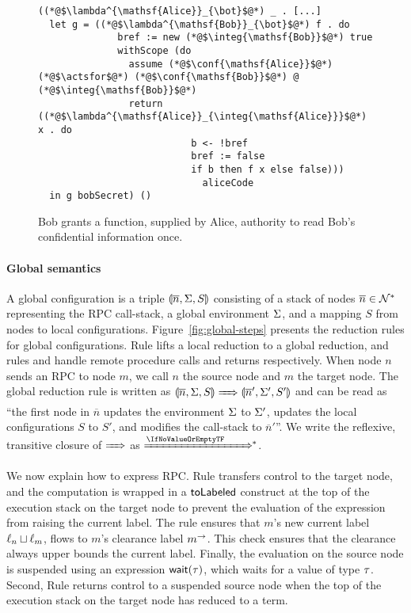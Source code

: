 \begin{figure}
\centering
\begin{lstlisting}
((*@$\lambda^{\mathsf{Alice}}_{\bot}$@*) _ . [...]
  let g = ((*@$\lambda^{\mathsf{Bob}}_{\bot}$@*) f . do
              bref := new (*@$\integ{\mathsf{Bob}}$@*) true
              withScope (do
                assume (*@$\conf{\mathsf{Alice}}$@*) (*@$\actsfor$@*) (*@$\conf{\mathsf{Bob}}$@*) @ (*@$\integ{\mathsf{Bob}}$@*)
                return ((*@$\lambda^{\mathsf{Alice}}_{\integ{\mathsf{Alice}}}$@*) x . do
                           b <- !bref
                           bref := false
                           if b then f x else false)))
                             aliceCode
  in g bobSecret) ()
\end{lstlisting}
\caption{Bob grants a function, supplied by Alice, authority to read Bob's confidential information once. }
\label{fig:use-case-for-fluid-scope}
\end{figure}

\paragraph{Global semantics}
A global configuration is a triple $\llparenthesis \overline{n}, \Sigma, S \rrparenthesis$ consisting of a stack of nodes $\overline{n} \in \mathcal{N}^*$ representing the RPC call-stack, a global environment $\Sigma$, and a mapping $S$ from nodes to local configurations. Figure~\ref{fig:global-steps} presents the reduction rules for global configurations. Rule  lifts a local reduction to a global reduction, and rules  and  handle remote procedure calls and returns respectively. When node $n$ sends an RPC to node $m$, we call $n$ the source node and $m$ the target node. The global reduction rule is written as $\gconfig{\overline{n}}{\env}{S} \gstepsto \gconfig{\overline{n}'}{\env'}{S'}$ and can be read as ``the first node in $\overline{n}$ updates the environment $\Sigma$ to $\Sigma'$, updates the local configurations $S$ to $S'$, and modifies the call-stack to $\overline{n}'$''. We write the reflexive, transitive closure of $\gstepsto$ as $\gstepstos$.

We now explain how to express RPC. Rule  transfers control to the target node, and the computation is wrapped in a $\mathsf{toLabeled}$ construct at the top of the execution stack on the target node to prevent the evaluation of the expression from raising the current label.
The rule ensures that $m$'s new current label $\ell_n \sqcup \ell_m$, flows to $m$'s clearance label $m^{\rightarrow}$. This check ensures that the clearance always upper bounds the current label.
Finally, the evaluation on the source node is suspended using an expression $\wait[\type]$, which waits for a value of type $\tau$. Second, Rule  returns control to a suspended source node when the top of the execution stack on the target node has reduced to a term.

